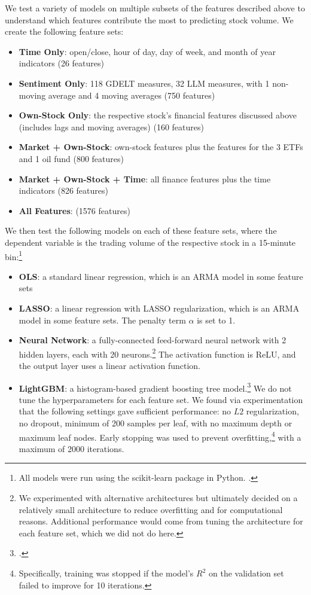 \documentclass[12pt]{article}
\begin{document}
We test a variety of models on multiple subsets of the features described above to understand which features contribute the most to predicting stock volume. We create the following feature sets:
\begin{itemize}
\singlespacing
    \item \textbf{Time Only}: open/close, hour of day, day of week, and month of year indicators (26 features)
    \item \textbf{Sentiment Only}: 118 GDELT measures, 32 LLM measures, with 1 non-moving average and 4 moving averages (750 features)
    \item \textbf{Own-Stock Only}: the respective stock's financial features discussed above (includes lags and moving averages) (160 features)
    \item \textbf{Market + Own-Stock}: own-stock features plus the features for the 3 ETFs and 1 oil fund (800 features)
    \item \textbf{Market + Own-Stock + Time}: all finance features plus the time indicators (826 features)
    \item \textbf{All Features}: (1576 features)
\end{itemize}
We then test the following models on each of these feature sets, where the dependent variable is the trading volume of the respective stock in a 15-minute bin:\footnote{All models were run using the \textsf{scikit-learn} package in Python. \textcite{scikit-learn}.}
\begin{itemize}
\singlespacing
    \item \textbf{OLS}: a standard linear regression, which is an ARMA model in some feature sets
    \item \textbf{LASSO}: a linear regression with LASSO regularization, which is an ARMA model in some feature sets. The penalty term $\alpha$ is set to 1.
    \item \textbf{Neural Network}: a fully-connected feed-forward neural network with 2 hidden layers, each with 20 neurons.\footnote{We experimented with alternative architectures but ultimately decided on a relatively small architecture to reduce overfitting and for computational reasons. Additional performance would come from tuning the architecture for each feature set, which we did not do here.} The activation function is ReLU, and the output layer uses a linear activation function.
    \item \textbf{LightGBM}: a histogram-based gradient boosting tree model.\footnote{\textcite{ke2017lightgbm}.} We do not tune the hyperparameters for each feature set. We found via experimentation that the following settings gave sufficient performance: no $L2$ regularization, no dropout, minimum of 200 samples per leaf, with no maximum depth or maximum leaf nodes. Early stopping was used to prevent overfitting,\footnote{Specifically, training was stopped if the model's $R^2$ on the validation set failed to improve for 10 iterations.} with a maximum of 2000 iterations.
\end{itemize}
\end{document}
